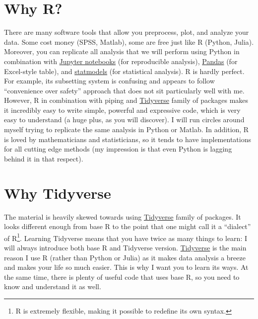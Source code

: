 \documentclass[
]{book}
\begin{document}
\hypertarget{why-r}{%
\section*{Why R?}\label{why-r}}

There are many software tools that allow you preprocess, plot, and analyze your data. Some cost money (SPSS, Matlab), some are free just like R (Python, Julia). Moreover, you can replicate all analysis that we will perform using Python in combination with \href{https://jupyter.org/}{Jupyter notebooks} (for reproducible analysis), \href{https://pandas.pydata.org/}{Pandas} (for Excel-style table), and \href{https://www.statsmodels.org/stable/index.html}{statmodels} (for statistical analysis). R is hardly perfect. For example, its subsetting system is confusing and appears to follow ``convenience over safety'' approach that does not sit particularly well with me. However, R in combination with piping and \href{https://www.tidyverse.org/}{Tidyverse} family of packages makes it incredibly easy to write simple, powerful and expressive code, which is very easy to understand (a huge plus, as you will discover). I will run circles around myself trying to replicate the same analysis in Python or Matlab. In addition, R is loved by mathematicians and statisticians, so it tends to have implementations for all cutting edge methods (my impression is that even Python is lagging behind it in that respect).

\hypertarget{why-tidyverse}{%
\section*{Why Tidyverse}\label{why-tidyverse}}

The material is heavily skewed towards using \href{https://www.tidyverse.org/}{Tidyverse} family of packages. It looks different enough from base R to the point that one might call it a ``dialect'' of R\footnote{R is extremely flexible, making it possible to redefine its own syntax.}. Learning Tidyverse means that you have twice as many things to learn: I will always introduce both base R and Tidyverse version. \href{https://www.tidyverse.org/}{Tidyverse} is the main reason I use R (rather than Python or Julia) as it makes data analysis a breeze and makes your life so much easier. This is why I want you to learn its ways. At the same time, there is plenty of useful code that uses base R, so you need to know and understand it as well.
\end{document}
